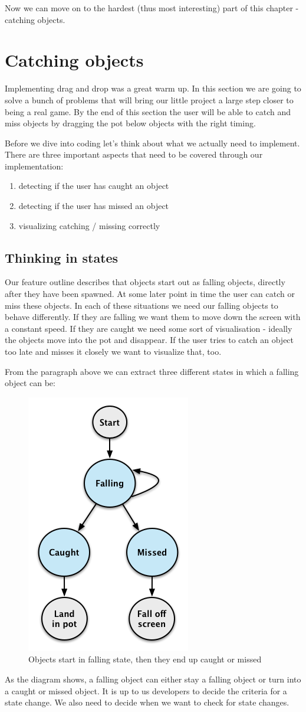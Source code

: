 Now we can move on to the hardest (thus most interesting) part of this chapter
- catching objects.

\section{Catching objects}
Implementing drag and drop was a great warm up. In this section we are going to
solve a bunch of problems that will bring our little project a large step closer
to being a real game. By the end of this section the user will be able to catch
and miss objects by dragging the pot below objects with the right timing.

Before we dive into coding let's think about what we actually need to implement.
There are three important aspects that need to be covered through our
implementation:
\begin{enumerate}
  \item detecting if the user has caught an object
  \item detecting if the user has missed an object
  \item visualizing catching / missing correctly
\end{enumerate}

\subsection{Thinking in states}
Our feature outline describes that objects start out as falling objects,
directly after they have been spawned. At some later point in time the user can
catch or miss these objects. In each of these situations we need our falling objects to behave differently. If they are
falling we want them to move down the screen with a constant speed. If they are
caught we need some sort of visualisation - ideally the objects move into the
pot and disappear. If the user tries to catch an object too late and misses it
closely we want to visualize that, too.

From the paragraph above we can extract three different states in which a
falling object can be:
\begin{figure}[H]
		\centering
		\includegraphics[width=0.3\linewidth]{images/Chapter3/falling_object_states.png}
		\caption{Objects start in falling state, then they end up caught or missed}
\end{figure}
As the diagram shows, a falling object can either stay a falling object or turn
into a caught or missed object. It is up to us developers to decide the criteria
for a state change. We also need to decide when we want to check for state
changes.

